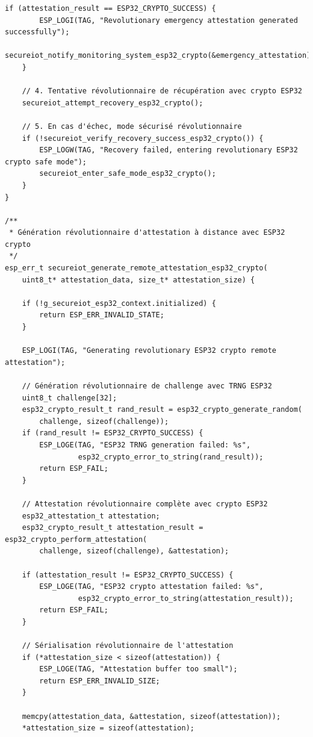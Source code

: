 \begin{lstlisting}[caption={Implémentation révolutionnaire complète du module de vérification d'intégrité ESP32 crypto intégré}]
    if (attestation_result == ESP32_CRYPTO_SUCCESS) {
        ESP_LOGI(TAG, "Revolutionary emergency attestation generated successfully");
        secureiot_notify_monitoring_system_esp32_crypto(&emergency_attestation);
    }
    
    // 4. Tentative révolutionnaire de récupération avec crypto ESP32
    secureiot_attempt_recovery_esp32_crypto();
    
    // 5. En cas d'échec, mode sécurisé révolutionnaire
    if (!secureiot_verify_recovery_success_esp32_crypto()) {
        ESP_LOGW(TAG, "Recovery failed, entering revolutionary ESP32 crypto safe mode");
        secureiot_enter_safe_mode_esp32_crypto();
    }
}

/**
 * Génération révolutionnaire d'attestation à distance avec ESP32 crypto
 */
esp_err_t secureiot_generate_remote_attestation_esp32_crypto(
    uint8_t* attestation_data, size_t* attestation_size) {
    
    if (!g_secureiot_esp32_context.initialized) {
        return ESP_ERR_INVALID_STATE;
    }
    
    ESP_LOGI(TAG, "Generating revolutionary ESP32 crypto remote attestation");
    
    // Génération révolutionnaire de challenge avec TRNG ESP32
    uint8_t challenge[32];
    esp32_crypto_result_t rand_result = esp32_crypto_generate_random(
        challenge, sizeof(challenge));
    if (rand_result != ESP32_CRYPTO_SUCCESS) {
        ESP_LOGE(TAG, "ESP32 TRNG generation failed: %s", 
                 esp32_crypto_error_to_string(rand_result));
        return ESP_FAIL;
    }
    
    // Attestation révolutionnaire complète avec crypto ESP32
    esp32_attestation_t attestation;
    esp32_crypto_result_t attestation_result = esp32_crypto_perform_attestation(
        challenge, sizeof(challenge), &attestation);
    
    if (attestation_result != ESP32_CRYPTO_SUCCESS) {
        ESP_LOGE(TAG, "ESP32 crypto attestation failed: %s", 
                 esp32_crypto_error_to_string(attestation_result));
        return ESP_FAIL;
    }
    
    // Sérialisation révolutionnaire de l'attestation
    if (*attestation_size < sizeof(attestation)) {
        ESP_LOGE(TAG, "Attestation buffer too small");
        return ESP_ERR_INVALID_SIZE;
    }
    
    memcpy(attestation_data, &attestation, sizeof(attestation));
    *attestation_size = sizeof(attestation);
    

\end{lstlisting}
